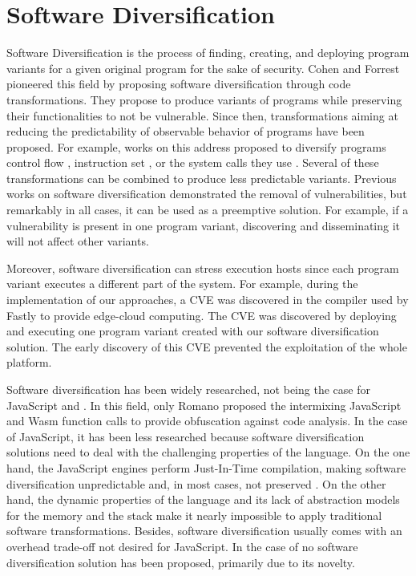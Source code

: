 \section{Software Diversification}

Software Diversification is the process of finding, creating, and deploying program variants for a given original program \cite{okhravi2013survey} for the sake of security.
Cohen \etal \cite{cohen1993operating} and Forrest \etal \cite{595185} pioneered this field by proposing software diversification through code transformations. 
They propose to produce variants of programs while preserving their functionalities to not be vulnerable.
Since then, transformations aiming at reducing the predictability of observable behavior of programs have been proposed. For example, works on this address proposed to diversify programs control flow \cite{davi2015isomeron}, instruction set \cite{barrantes2003randomized}, or the system calls they use \cite{Chew02mitigatingbuffer}. 
Several of these transformations can be combined to produce less predictable variants.
Previous works on software diversification demonstrated the removal of vulnerabilities, but remarkably in all cases, it can be used as a preemptive solution.
For example, if a vulnerability is present in one program variant, discovering and disseminating it will not affect other variants.

Moreover, software diversification can stress execution hosts since each program variant executes a different part of the system. For example, during the implementation of our approaches, a CVE \cite{CVE} was discovered in the compiler used by Fastly to provide edge-cloud computing.
The CVE was discovered by deploying and executing one program variant created with our software diversification solution.
The early discovery of this CVE prevented the exploitation of the whole platform.


Software diversification has been widely researched, not being the case for JavaScript and \wasm.
In this field, only Romano \etal \cite{wobfuscator} proposed the intermixing JavaScript and Wasm function calls to provide obfuscation against code analysis. 
In the case of JavaScript, it has been less researched because software diversification solutions need to deal with the challenging properties of the language.
On the one hand, the JavaScript engines perform Just-In-Time compilation, making software diversification unpredictable and, in most cases, not preserved \cite{STRAC}.
On the other hand, the dynamic properties of the language and its lack of abstraction models for the memory and the stack make it nearly impossible to apply traditional software transformations.
Besides, software diversification usually comes with an overhead trade-off not desired for JavaScript. 
In the case of \wasm no software diversification solution has been proposed, primarily due to its novelty.






